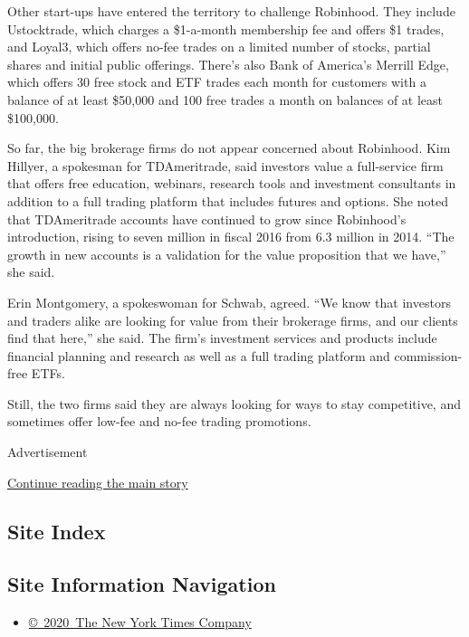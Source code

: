 Other start-ups have entered the territory to challenge Robinhood. They
include Ustocktrade, which charges a \$1-a-month membership fee and
offers \$1 trades, and Loyal3, which offers no-fee trades on a limited
number of stocks, partial shares and initial public offerings. There's
also Bank of America's Merrill Edge, which offers 30 free stock and ETF
trades each month for customers with a balance of at least \$50,000 and
100 free trades a month on balances of at least \$100,000.

So far, the big brokerage firms do not appear concerned about Robinhood.
Kim Hillyer, a spokesman for TDAmeritrade, said investors value a
full-service firm that offers free education, webinars, research tools
and investment consultants in addition to a full trading platform that
includes futures and options. She noted that TDAmeritrade accounts have
continued to grow since Robinhood's introduction, rising to seven
million in fiscal 2016 from 6.3 million in 2014. ``The growth in new
accounts is a validation for the value proposition that we have,'' she
said.

Erin Montgomery, a spokeswoman for Schwab, agreed. ``We know that
investors and traders alike are looking for value from their brokerage
firms, and our clients find that here,'' she said. The firm's investment
services and products include financial planning and research as well as
a full trading platform and commission-free ETFs.

Still, the two firms said they are always looking for ways to stay
competitive, and sometimes offer low-fee and no-fee trading promotions.

Advertisement

\protect\hyperlink{after-bottom}{Continue reading the main story}

\hypertarget{site-index}{%
\subsection{Site Index}\label{site-index}}

\hypertarget{site-information-navigation}{%
\subsection{Site Information
Navigation}\label{site-information-navigation}}

\begin{itemize}
\tightlist
\item
  \href{https://help.nytimes3xbfgragh.onion/hc/en-us/articles/115014792127-Copyright-notice}{©~2020~The
  New York Times Company}
\end{itemize}

